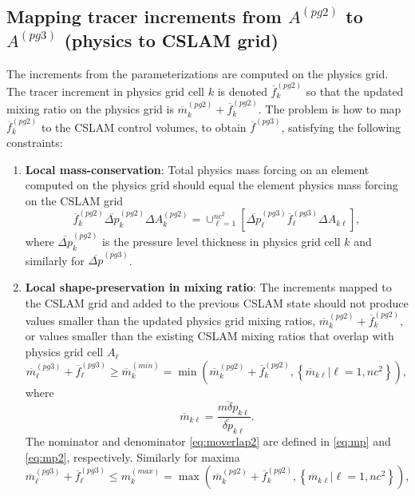 \subsection{Mapping tracer increments from $A^{(pg2)}$ to $A^{(pg3)}$ (physics to CSLAM grid)}\label{sec:pgtonc}
The increments from the parameterizations are computed on the physics grid. The tracer increment in physics grid cell $k$ is denoted $\overline{f}_k^{(pg2)}$ so that the updated mixing ratio on the physics grid is ${\overline{m}}^{(pg2)}_k+\overline{f}_k^{(pg2)}$. The problem is how to map $\overline{f}_k^{(pg2)}$ to the CSLAM control volumes, to obtain ${\overline{f}}^{(pg3)}$, satisfying the following constraints:
\begin{enumerate}
\item {\bf{Local mass-conservation}}: Total physics mass forcing on an element computed on the physics grid should equal the element physics mass forcing on the CSLAM grid
\begin{equation}
{\overline{f}}_k^{(pg2)}{\overline{\Delta p}}^{(pg2)}_k\Delta A_k^{(pg2)}=\cup_{\ell=1}^{nc^2}\left[{\overline{\Delta p}}^{(pg3)}_\ell {\overline{f}}^{(pg3)}_\ell\Delta A_{k\ell}\right],
\end{equation}
where $\overline{\Delta p}^{(pg2)}_k$ is the pressure level thickness in physics grid cell $k$ and similarly for $\overline{\Delta p}^{(pg3)}$.
\item {\bf{Local shape-preservation in mixing ratio}}: The increments mapped to the CSLAM grid and added to the previous CSLAM state should not produce values smaller than the updated physics grid mixing ratios, ${\overline{m}}^{(pg2)}_k+\overline{f}_k^{(pg2)}$, or values smaller than the existing CSLAM mixing ratios that overlap with physics grid cell $A_\ell$
\begin{equation}
\label{eq:min}
{\overline{m}}^{(pg3)}_\ell+{\overline{f}}^{(pg3)}_\ell \ge {\overline{m}}^{(min)}_k=\min \left( {\overline{m}}^{(pg2)}_k+{\overline{f}}_k^{(pg2)},\left\{ {\overline{m}}_{k\ell} |\ell=1,nc^2\right\} \right),
\end{equation}
where
\begin{equation}
\label{eq:moverlap2}
\overline{m}_{k\ell}=\frac{\overline{m\delta p}_{k\ell}}{\overline{\delta p}_{k\ell}}.
\end{equation}
The nominator and denominator \eqref{eq:moverlap2} are defined in \eqref{eq:mp} and \eqref{eq:mp2}, respectively. Similarly for maxima
\begin{equation}
\label{eq:max}
{\overline{m}}^{(pg3)}_\ell+{\overline{f}}^{(pg3)}_\ell \le m_k^{(max)}=\max \left( {\overline{m}}^{(pg2)}_k+\overline{f}_k^{(pg2)},\left\{ {\overline{m}}_{k\ell} |\ell=1,nc^2\right\} \right),

\end{equation}
\end{enumerate}
